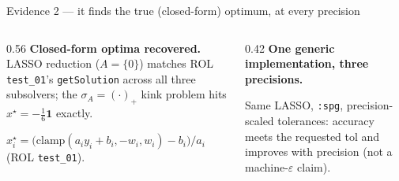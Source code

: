 \documentclass[aspectratio=169,10pt]{beamer}
\newcommand{\fdata}[1]{data/#1}
\begin{document}
\begin{frame}{Evidence 2 --- it finds the true (closed-form) optimum, at every precision}
  \small
  \begin{columns}[T]
  \begin{column}{0.56\textwidth}
   \textbf{Closed-form optima recovered.} LASSO reduction ($A=\{0\}$) matches ROL
   \texttt{test\_01}'s \texttt{getSolution} across all three subsolvers; the
   $\sigma_A=(\cdot)_+$ kink problem hits $x^\star=-\tfrac16\mathbf1$ exactly.
   \medskip
   {\scriptsize\centering\par}
   \medskip
   {\footnotesize $x^\star_i=\big(\mathrm{clamp}(a_iy_i{+}b_i,-w_i,w_i)-b_i\big)/a_i$ (ROL \texttt{test\_01}).}
  \end{column}
  \begin{column}{0.42\textwidth}
   \textbf{One generic implementation, three precisions.}
   \begin{center}
   \end{center}
   {\footnotesize Same LASSO, \texttt{:spg}, precision-scaled tolerances:
   accuracy meets the requested tol and improves with precision (not a machine-$\varepsilon$ claim).}
  \end{column}
  \end{columns}
\end{frame}
\end{document}
